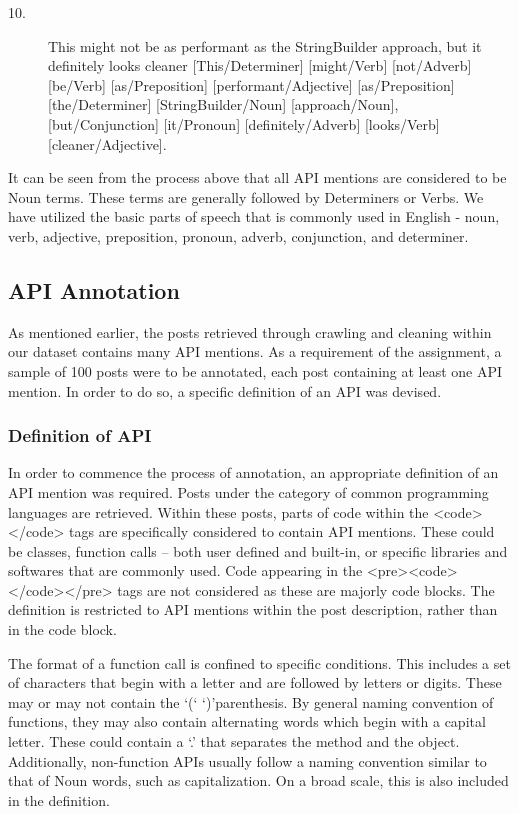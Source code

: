 \documentclass{sig-alternate-05-2015}
\begin{document}
\begin{description}
\item[10.]
This might not be as performant as the StringBuilder approach, but it definitely looks cleaner \linebreak
{[This/Determiner]} [might/Verb] [not/Adverb] [be/Verb] \linebreak
{[as/Preposition]} [performant/Adjective] [as/Preposition] \linebreak
{[the/Determiner]} [StringBuilder/Noun] [approach/Noun], \linebreak
{[but/Conjunction]} [it/Pronoun] [definitely/Adverb] \linebreak
{[looks/Verb]} [cleaner/Adjective].
\end{description}

It can be seen from the process above that all API mentions are considered to be Noun terms. These terms are generally followed by Determiners or Verbs. We have utilized the basic parts of speech that is commonly used in English - noun, verb, adjective, preposition, pronoun, adverb, conjunction, and determiner.

\subsection{API Annotation}
As mentioned earlier, the posts retrieved through crawling and cleaning within our dataset contains many API mentions. As a requirement of the assignment, a sample of 100 posts were to be annotated, each post containing at least one API mention. In order to do so, a specific definition of an API was devised. 

\subsubsection{Definition of API}
In order to commence the process of annotation, an appropriate definition of an API mention was required. Posts under the category of common programming languages are retrieved. Within these posts, parts of code within the <code></code> tags are specifically considered to contain API mentions. These could be classes, function calls – both user defined and built-in, or specific libraries and softwares that are commonly used. Code appearing in the {<pre><code>}\linebreak
{</code></pre>} tags are not considered as these are majorly code blocks. The definition is restricted to API mentions within the post description, rather than in the code block. 


The format of a function call is confined to specific conditions. This includes a set of characters that begin with a letter and are followed by letters or digits.  These may or may not contain the ‘(‘ ‘)’parenthesis. By general naming convention of functions, they may also contain alternating words which begin with a capital letter. These could contain a ‘.’ that separates the method and the object. Additionally, non-function APIs usually follow a naming convention similar to that of Noun words, such as capitalization. On a broad scale, this is also included in the definition. 
\end{document}
